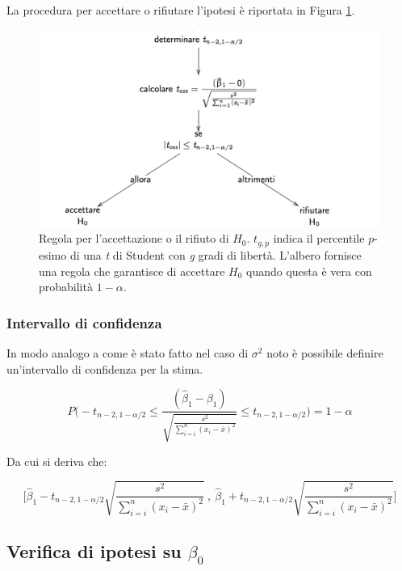 La procedura per accettare o rifiutare l'ipotesi è riportata in Figura \ref{pvalueacc}.

\begin{figure}[htbp]
\centering
\includegraphics[width=.9\textwidth]{./notes/immagini/l6-fig9-1.png}
\caption{Regola per l'accettazione o il rifiuto di $ H_0 $. $ t_{g,p} $ indica il percentile $ p $-esimo di una \textit{t} di Student con \textit{g} gradi di libertà. L'albero fornisce una regola che garantisce di accettare $ H_0 $ quando questa è vera con probabilità $ 1 - \alpha $.}\label{pvalueacc}
\end{figure}

\subsubsection{Intervallo di confidenza}\label{intevallo-di-confidenza}
In modo analogo a come è stato fatto nel caso di $ \sigma^2 $ noto è possibile definire un'intervallo di confidenza per la stima.

$$
P\Bigg( -t_{n-2, 1-\alpha/2} \leq \frac{(\hat{\beta}_1 - \beta_1)}{\sqrt{\frac{s^2}{\sum_{i=i}^{n} (x_i - \bar{x})^2}}}\leq  t_{n-2, 1-\alpha/2}\Bigg) = 1 - \alpha
$$

Da cui si deriva che:

$$
\Bigg[ \hat{\beta}_1 - t_{n-2, 1-\alpha/2}  \sqrt{\frac{s^2}{\sum_{i=i}^{n} (x_i - \bar{x})^2}} \:,\: \hat{\beta}_1 + t_{n-2, 1-\alpha/2} \sqrt{\frac{s^2}{\sum_{i=i}^{n} (x_i - \bar{x})^2}}  \Bigg]
$$

\subsection{Verifica di ipotesi su $ \beta_0 $}\label{verifica-di-ipotesi-su-beta0}

